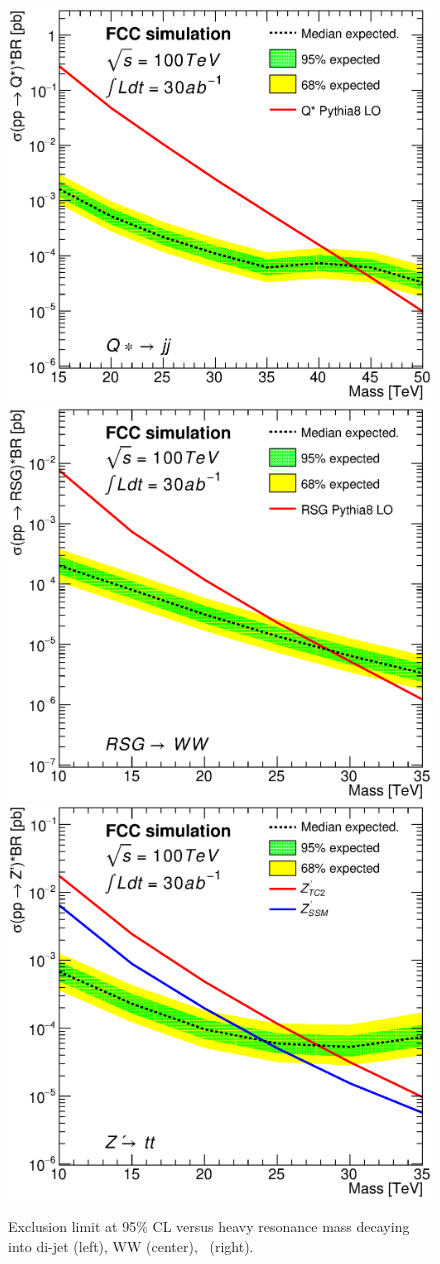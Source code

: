 \begin{figure}[!htb]
  \centering
  \includegraphics[width=0.30\columnwidth]{Fig/lim_Qstar_jj_fcc_v02.eps}
  \includegraphics[width=0.30\columnwidth]{Fig/lim_RSGraviton_ww_fcc_v02.eps}
  \includegraphics[width=0.30\columnwidth]{Fig/lim_Zprime_tt_fcc_v02.eps}
  \caption{Exclusion limit at 95\% CL versus heavy resonance mass decaying into di-jet (left), WW (center), \ttbar\ (right).}
  \label{figure:hadronicresonances:limits}
\end{figure}

